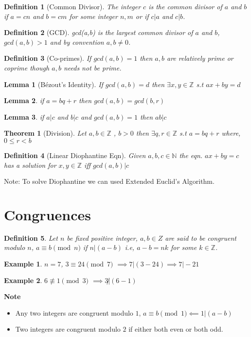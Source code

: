 \documentclass[12pt,a4paper]{article}
\newcommand{\Z}{\mathbb{Z}}
\newcommand{\N}{\mathbb{N}}
\newtheorem{thm}{Theorem}
\newtheorem{defn}{Definition}
\newtheorem{lem}{Lemma}
\newtheorem{ex}{Example}
\begin{document}
\begin{defn}[Common Divisor]
	The integer $c$ is the common divisor of $a$ and $b$ if $a=cn$ and $b=cm$ for some integer $n,m$ or if $c|a$ and $c|b$.
\end{defn}
\begin{defn}[GCD]
	gcd(a,b) is the largest common divisor of $a$ and $b$, $gcd(a,b)>1$ and by convention $a,b \ne 0$.
\end{defn}
\begin{defn}[Co-primes]
	If $gcd(a,b)=1$ then $a,b$ are relatively prime or coprime though $a,b$ needs not be prime.
\end{defn}

\begin{lem}[B\'ezout's Identity]
	If $gcd(a,b)=d$ then $ \exists x,y \in \Z$ s.t $ax+by=d$
\end{lem}
\begin{lem}
	if $a=bq+r$ then $gcd(a,b)=gcd(b,r)$
\end{lem}
\begin{lem}
	if $a|c$ and $b|c$ and $gcd(a,b)=1$ then $ab|c$
\end{lem}
\begin{thm}[Division]
	Let $a,b \in \Z$ , $b>0$ then $\exists q,r \in \Z$ s.t $a=bq+r$ where, $0\le r < b$
\end{thm}
 
\begin{defn}[Linear Diophantine Eqn]
	Given $a,b,c \in \N $ the eqn. $ax+by=c$ has a solution for $x,y \in \Z$ iff $gcd(a,b)|c$
\end{defn} 
 Note: To solve Diophantine we can used Extended Euclid's Algorithm.
\section{Congruences}
\begin{defn}
	Let $n$ be fixed positive integer, $a,b \in Z$ are said to be congruent modulo $n$, $a \equiv b \pmod n$ if $n|(a-b)$ i.e, $a-b = nk$ for some $k \in \Z$.
\end{defn}
\begin{ex}
	$n=7$, $3 \equiv 24 \pmod 7$ $\implies 7|(3-24) \implies 7|-21$
\end{ex}
\begin{ex}
 $6 \not \equiv 1 \pmod 3$ $\implies 3 \not |(6-1) $
\end{ex}

\textbf{Note}
\begin{itemize}
	\item Any two integers are congruent modulo $1$, $a\equiv b \pmod 1 \impliedby 1|(a-b)$
	\item Two integers are congruent modulo $2$ if either both even or both odd.
\end{itemize}
\end{document}
